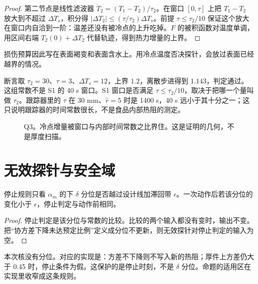 \begin{proof}
第二节点是线性滤波器 \(\dot T_2=(T_1-T_2)/\tau_2\)。在窗口 \([0,\tau]\) 上把 \(T_1-T_2\) 放大到不超过 \(\Delta T_s\)，积分得 \(|\Delta T_2|\le (\tau/\tau_2)\Delta T_s\)。前提 \(\tau\le\tau_2/10\) 保证这个放大在窗口内自洽到一阶：温差还没有被冷点的上升吃掉。\(F\) 的被积函数对温度单调，用区间右端 \(T_2(0)+\Delta T_2\) 代替轨迹，得到热力增量的上界。
\end{proof}

损伤预算因此写在表面褐变和表面含水上。用冷点温度否决探针，会放过表面已经越界的情况。

断言取 \(\tau_2=30\)、\(\tau=3\)、\(\Delta T_s=12\)，上界 \(1.2\)，离散步进得到 \(1.143\)，判定通过。这组常数不是 S1 的 40 s 窗口。S1 窗口是否满足 \(\tau\le\tau_2/10\)，取决于把哪一个量叫做 \(\tau_2\)。跟踪器里的 \(\tau\) 在 30 mm、\(\hat r=5\) 时是 1400 s，40 s 远小于其十分之一；这只说明跟踪器的时间常数很长，不是食品内部热阻的测定。

\begin{figure}[ht]
\centering
{}
\caption{Q3。冷点增量被窗口与内部时间常数之比界住。这是证明的几何，不是厚度扫描。}
\end{figure}

\section{无效探针与安全域}

\begin{proposition}[分位滞回]
\label{prop:invalid}
停止规则只看 \(\alpha_m\) 的下 \(\delta\) 分位是否越过设计线加滞回带 \(\epsilon\)。一次动作后若该分位的变化小于 \(\epsilon\)，停止判定与动作前相同。
\end{proposition}

\begin{proof}
停止判定是该分位与常数的比较。比较的两个输入都没有变时，输出不变。把“协方差下降未达预定比例”定义成分位不更新，则无效探针对停止判定的输入为空。
\end{proof}

本次核没有分位。对应的实现是：方差不下降则不写入新的热阻；厚件上方差仍大于 0.45 时，停止条件为假。这保护的是停止时刻，不是 \(\delta\) 分位。命题的适用区在实现里收窄成这条规则。

